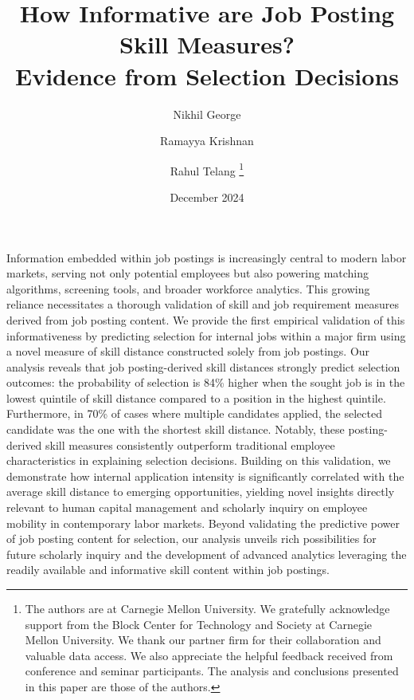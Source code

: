 \documentclass[letterpaper,11pt,leqno]{article}
\newcommand{\bib}{references.bib}
\begin{document}
\title{How Informative are Job Posting Skill Measures? \\ Evidence from Selection Decisions}
\author{%
 Nikhil George \and Ramayya Krishnan \and Rahul Telang%
 \thanks{The authors are at Carnegie Mellon University. We gratefully acknowledge support from the Block Center for Technology and Society at Carnegie Mellon University. We thank our partner firm for their collaboration and valuable data access. We also appreciate the helpful feedback received from conference and seminar participants. The analysis and conclusions presented in this paper are those of the authors.}%
}
\date{December 2024}

\begin{titlepage}
\maketitle

Information embedded within job postings is increasingly central to modern labor markets, serving not only potential employees but also powering 
matching algorithms, screening tools, and broader workforce analytics. This growing reliance necessitates a thorough validation of skill and job requirement 
measures derived from job posting content. We provide the first empirical validation of this informativeness by predicting selection for internal jobs within 
a major firm using a novel measure of skill distance constructed solely from job postings. Our analysis reveals that job posting-derived skill distances 
strongly predict selection outcomes: the probability of selection is 84\% higher when the sought job is in the lowest quintile of skill distance 
compared to a position in the highest quintile. Furthermore, in 70\% of cases where multiple candidates applied, the selected candidate 
was the one with the shortest skill distance. Notably, these posting-derived skill measures consistently outperform traditional employee 
characteristics in explaining selection decisions. Building on this validation, we demonstrate how internal application intensity is 
significantly correlated with the average skill distance to emerging opportunities, yielding novel insights directly relevant to 
human capital management and scholarly inquiry on employee mobility in contemporary labor markets. Beyond validating the predictive power 
of job posting content for selection, our analysis unveils rich possibilities for future scholarly inquiry and the development of 
advanced analytics leveraging the readily available and informative skill content within job postings.

\end{titlepage}










\end{document}
